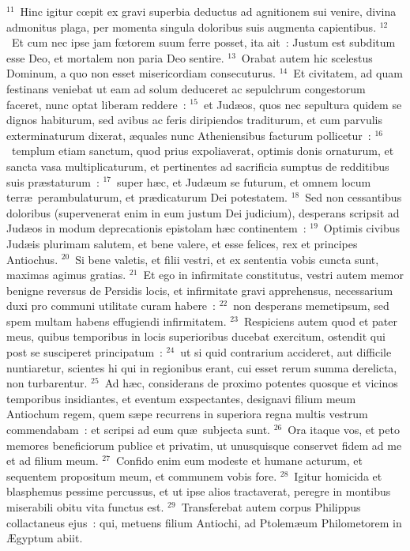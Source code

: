 ${}^{11}$~Hinc igitur cœpit ex gravi superbia deductus ad agnitionem sui venire, divina admonitus plaga, per momenta singula doloribus suis augmenta capientibus.
${}^{12}$~Et cum nec ipse jam fœtorem suum ferre posset, ita ait~: Justum est subditum esse Deo, et mortalem non paria Deo sentire.
${}^{13}$~Orabat autem hic scelestus Dominum, a quo non esset misericordiam consecuturus.
${}^{14}$~Et civitatem, ad quam festinans veniebat ut eam ad solum deduceret ac sepulchrum congestorum faceret, nunc optat liberam reddere~:
${}^{15}$~et Jud\ae os, quos nec sepultura quidem se dignos habiturum, sed avibus ac feris diripiendos traditurum, et cum parvulis exterminaturum dixerat, \ae quales nunc Atheniensibus facturum pollicetur~:
${}^{16}$~templum etiam sanctum, quod prius expoliaverat, optimis donis ornaturum, et sancta vasa multiplicaturum, et pertinentes ad sacrificia sumptus de redditibus suis pr\ae staturum~:
${}^{17}$~super h\ae c, et Jud\ae um se futurum, et omnem locum terr\ae\ perambulaturum, et pr\ae dicaturum Dei potestatem.
${}^{18}$~Sed non cessantibus doloribus (supervenerat enim in eum justum Dei judicium), desperans scripsit ad Jud\ae os in modum deprecationis epistolam h\ae c continentem~:
${}^{19}$~Optimis civibus Jud\ae is plurimam salutem, et bene valere, et esse felices, rex et principes Antiochus.
${}^{20}$~Si bene valetis, et filii vestri, et ex sententia vobis cuncta sunt, maximas agimus gratias.
${}^{21}$~Et ego in infirmitate constitutus, vestri autem memor benigne reversus de Persidis locis, et infirmitate gravi apprehensus, necessarium duxi pro communi utilitate curam habere~:
${}^{22}$~non desperans memetipsum, sed spem multam habens effugiendi infirmitatem.
${}^{23}$~Respiciens autem quod et pater meus, quibus temporibus in locis superioribus ducebat exercitum, ostendit qui post se susciperet principatum~:
${}^{24}$~ut si quid contrarium accideret, aut difficile nuntiaretur, scientes hi qui in regionibus erant, cui esset rerum summa derelicta, non turbarentur.
${}^{25}$~Ad h\ae c, considerans de proximo potentes quosque et vicinos temporibus insidiantes, et eventum exspectantes, designavi filium meum Antiochum regem, quem s\ae pe recurrens in superiora regna multis vestrum commendabam~: et scripsi ad eum qu\ae\ subjecta sunt.
${}^{26}$~Ora itaque vos, et peto memores beneficiorum publice et privatim, ut unusquisque conservet fidem ad me et ad filium meum.
${}^{27}$~Confido enim eum modeste et humane acturum, et sequentem propositum meum, et communem vobis fore.
${}^{28}$~Igitur homicida et blasphemus pessime percussus, et ut ipse alios tractaverat, peregre in montibus miserabili obitu vita functus est.
${}^{29}$~Transferebat autem corpus Philippus collactaneus ejus~: qui, metuens filium Antiochi, ad Ptolem\ae um Philometorem in \AE gyptum abiit.

